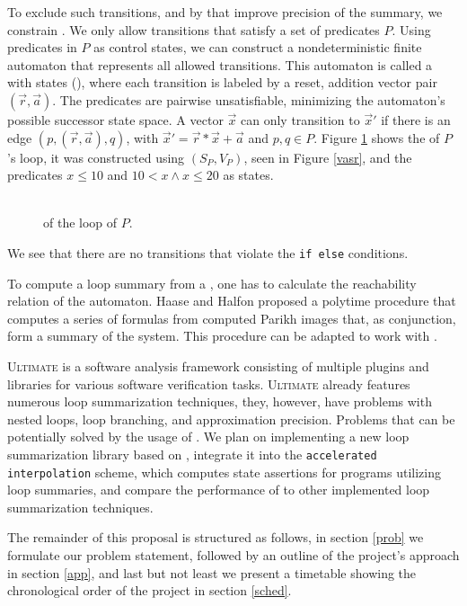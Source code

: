 To exclude such transitions, and by that improve precision of the summary, we constrain \qvasr. We only allow transitions that satisfy a set of predicates $P$. Using predicates in $P$ as control states, we can construct a nondeterministic finite automaton that represents all allowed transitions. This automaton is called a \qvasr with states (\qvasrs), where each transition is labeled by a reset, addition vector pair $(\vec{r}, \vec{a})$. The predicates are pairwise unsatisfiable, minimizing the automaton's possible successor state space. A vector $\vec{x}$ can only transition to $\vec{x}'$ if there is an edge $(p, (\vec{r}, \vec{a}), q)$, with $\vec{x}' = \vec{r} * \vec{x} + \vec{a}$ and $p, q \in P$.
Figure \ref{vasrs} shows the \qvasrs of $P$'s loop, it was constructed using $(S_P, V_P)$, seen in Figure \ref{vasr}, and the predicates $x \leq 10$ and $10 < x \land x \leq 20$ as states.
\begin{figure}[H]
	
	\caption{\\ \qvasrs of the loop of $P$.}
	\label{vasrs}
\end{figure}
 We see that there are no transitions that violate the \texttt{if else} conditions. \par
To compute a loop summary from a \qvasrs, one has to calculate the reachability relation of the automaton. Haase and Halfon \cite{DBLP:conf/rp/HaaseH14} proposed a polytime procedure that computes a series of formulas from computed Parikh images that, as conjunction, form a summary of the system. This procedure can be adapted to work with \qvasrs. \\ \par

\textsc{Ultimate}\cite{Zitat02} is a software analysis framework consisting of multiple plugins and libraries for various software verification tasks. \textsc{Ultimate} already features numerous loop summarization techniques, they, however, have problems with nested loops, loop branching, and approximation precision. Problems that can be potentially solved by the usage of \qvasrs. We plan on implementing a new loop summarization library based on \qvasrs, integrate it into the \texttt{accelerated interpolation} scheme, which computes state assertions for programs utilizing loop summaries, and compare the performance of \qvasrs to other implemented loop summarization techniques. \par
The remainder of this proposal is structured as follows, in section \ref{prob} we formulate our problem statement, followed by an outline of the project's approach in section \ref{app}, and last but not least we present a timetable showing the chronological order of the project in section \ref{sched}.
